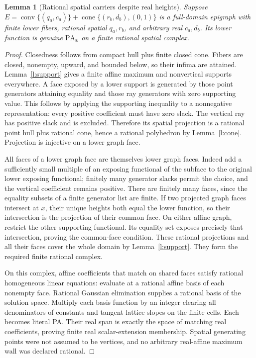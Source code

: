 \documentclass[11pt]{article}
\newtheorem{lemma}[theorem]{Lemma}
\theoremstyle{definition}\newtheorem{definition}[theorem]{Definition}
\theoremstyle{remark}\newtheorem{remark}[theorem]{Remark}
\newcommand{\R}{\mathbb R}\newcommand{\Q}{\mathbb Q}
\newcommand{\conv}{\operatorname{conv}}\newcommand{\cone}{\operatorname{cone}}
\newcommand{\PA}{\mathrm{PA}}\newcommand{\dist}{\operatorname{dist}}
\begin{document}
\begin{lemma}[Rational spatial carriers despite real heights]\label{l:graph}
Suppose $E=\conv\{(q_a,c_a)\}+\cone\{(r_b,d_b),(0,1)\}$ is a full-domain epigraph with finite lower fibers, rational spatial $q_a,r_b$, and arbitrary real $c_a,d_b$. Its lower function is genuine $\PA_{\R}$ on a finite rational spatial complex.
\end{lemma}
\begin{proof}
Closedness follows from compact hull plus finite closed cone. Fibers are closed, nonempty, upward, and bounded below, so their infima are attained. Lemma~\ref{l:support} gives a finite affine maximum and nonvertical supports everywhere. A face exposed by a lower support is generated by those point generators attaining equality and those ray generators with zero supporting value. This follows by applying the supporting inequality to a nonnegative representation: every positive coefficient must have zero slack. The vertical ray has positive slack and is excluded. Therefore its spatial projection is a rational point hull plus rational cone, hence a rational polyhedron by Lemma~\ref{l:cone}. Projection is injective on a lower graph face.

All faces of a lower graph face are themselves lower graph faces. Indeed add a sufficiently small multiple of an exposing functional of the subface to the original lower exposing functional; finitely many generator slacks permit the choice, and the vertical coefficient remains positive. There are finitely many faces, since the equality subsets of a finite generator list are finite. If two projected graph faces intersect at $x$, their unique heights both equal the lower function, so their intersection is the projection of their common face. On either affine graph, restrict the other supporting functional. Its equality set exposes precisely that intersection, proving the common-face condition. These rational projections and all their faces cover the whole domain by Lemma~\ref{l:support}. They form the required finite rational complex.

On this complex, affine coefficients that match on shared faces satisfy rational homogeneous linear equations: evaluate at a rational affine basis of each nonempty face. Rational Gaussian elimination supplies a rational basis of the solution space. Multiply each basis function by an integer clearing all denominators of constants and tangent-lattice slopes on the finite cells. Each becomes literal PA. Their real span is exactly the space of matching real coefficients, proving finite real scalar-extension membership. Spatial generating points were not assumed to be vertices, and no arbitrary real-affine maximum wall was declared rational.
\end{proof}
\end{document}
